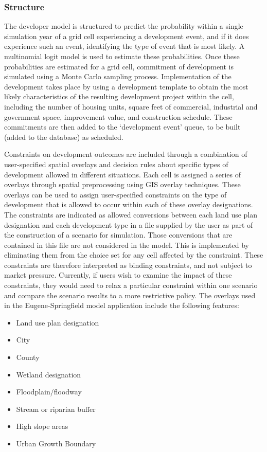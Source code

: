 \documentclass[fleqn]{article}
\newcommand{\tight}{\itemsep 0pt}
\begin{document}
\subsubsection{Structure}

The developer model is structured to predict the probability
within a single simulation year of a grid cell experiencing a
development event, and if it does experience such an event,
identifying the type of event that is most likely. A multinomial
logit model is used to estimate these probabilities. Once these
probabilities are estimated for a grid cell, commitment of
development is simulated using a Monte Carlo sampling process.
Implementation of the development takes place by using a
development template to obtain the most likely characteristics of
the resulting development project within the cell, including the
number of housing units, square feet of commercial, industrial and
government space, improvement value, and construction schedule.
These commitments are then added to the `development event' queue,
to be built (added to the database) as scheduled.

Constraints on development outcomes are included through a
combination of user-specified spatial overlays and decision rules
about specific types of development allowed in different
situations.  Each cell is assigned a series of overlays through
spatial preprocessing using GIS overlay techniques. These overlays
can be used to assign user-specified constraints on the type of
development that is allowed to occur within each of these overlay
designations.  The constraints are indicated as allowed
conversions between each land use plan designation and each
development type in a file supplied by the user as part of the
construction of a scenario for simulation. Those conversions that
are contained in this file are not considered in the model. This
is implemented by eliminating them from the choice set for any
cell affected by the constraint. These constraints are therefore
interpreted as binding constraints, and not subject to market
pressure.  Currently, if users wish to examine the impact of these
constraints, they would need to relax a particular constraint
within one scenario and compare the scenario results to a more
restrictive policy.  The overlays used in the Eugene-Springfield
model application include the following features:

\begin{itemize}
\tight
\item  Land use plan designation
\item  City
\item  County
\item  Wetland designation
\item  Floodplain/floodway
\item  Stream or riparian buffer
\item  High slope areas
\item  Urban Growth Boundary
\end{itemize}
\end{document}
